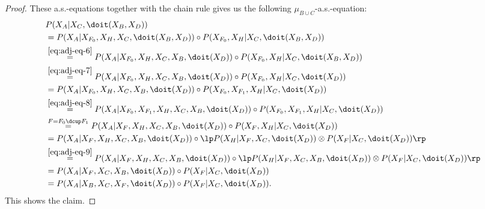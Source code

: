 \begin{Thm}
\begin{proof}
These a.s.-equations together with the chain rule gives us the following
$\mu_{B \cup C}$-a.s.-equation:
\begin{align*}
 & P(X_A|X_C,\doit(X_B,X_D)) \\
 &= P(X_A|X_{F_0},X_H,X_C,\doit(X_B,X_D)) \circ P(X_{F_0},X_H|X_C,\doit(X_B,X_D))\\
 &\stackrel{\ref{eq:adj-eq-6}}{=}
 P(X_A|X_{F_0},X_H,X_C,X_B,\doit(X_D))\circ P(X_{F_0},X_H|X_C,\doit(X_B,X_D)) \\
 &\stackrel{\ref{eq:adj-eq-7}}{=}
 P(X_A|X_{F_0},X_H,X_C,X_B,\doit(X_D))\circ P(X_{F_0},X_H|X_C,\doit(X_D)) \\
 &\stackrel{}{=}
 P(X_A|X_{F_0},X_H,X_C,X_B,\doit(X_D))\circ P(X_{F_0},X_{F_1},X_H|X_C,\doit(X_D)) \\
 & \stackrel{\ref{eq:adj-eq-8}}{=}
 P(X_A|X_{F_0},X_{F_1},X_H,X_C,X_B,\doit(X_D))\circ P(X_{F_0},X_{F_1},X_H|X_C,\doit(X_D)) \\
  & \stackrel{F=F_0\dcup F_1}{=}
 P(X_A|X_F,X_H,X_C,X_B,\doit(X_D))\circ P(X_F,X_H|X_C,\doit(X_D)) \\
 & \stackrel{}{=}
 P(X_A|X_F,X_H,X_C,X_B,\doit(X_D))\circ \lp P(X_H|X_F,X_C,\doit(X_D)) \otimes P(X_F|X_C,\doit(X_D))  \rp \\
  & \stackrel{\ref{eq:adj-eq-9}}{=}
 P(X_A|X_F,X_H,X_C,X_B,\doit(X_D))\circ \lp P(X_H|X_F,X_C,X_B,\doit(X_D)) \otimes P(X_F|X_C,\doit(X_D))  \rp \\
   & \stackrel{}{=}
 P(X_A|X_F,X_C,X_B,\doit(X_D))\circ  P(X_F|X_C,\doit(X_D)) \\
    & \stackrel{}{=}
 P(X_A|X_B,X_C,X_F,\doit(X_D))\circ  P(X_F|X_C,\doit(X_D)).
    \end{align*}
This shows the claim.
\end{proof}
\end{Thm}


